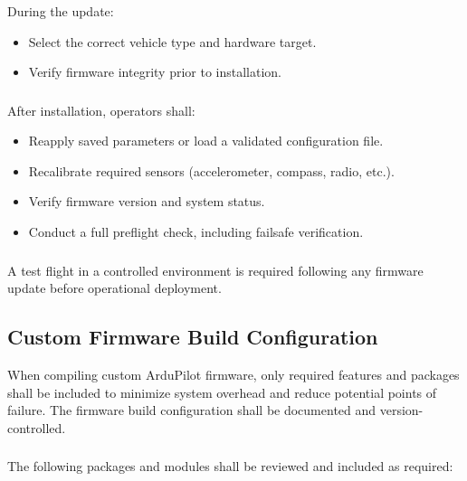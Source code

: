         \subsubsection{} During the update:
        \begin{itemize}
            \item Select the correct vehicle type and hardware target.
            \item Verify firmware integrity prior to installation.
        \end{itemize}
        
        \subsubsection{} After installation, operators shall:
        \begin{itemize}
            \item Reapply saved parameters or load a validated configuration file.
            \item Recalibrate required sensors (accelerometer, compass, radio, etc.).
            \item Verify firmware version and system status.
            \item Conduct a full preflight check, including failsafe verification.
        \end{itemize}
        
        \subsubsection{} A test flight in a controlled environment is required following any firmware update before operational deployment.
        
    \subsection{Custom Firmware Build Configuration}
        
        When compiling custom ArduPilot firmware, only required features and packages shall be included to minimize system overhead and reduce potential points of failure. The firmware build configuration shall be documented and version-controlled. 
        
        \subsubsection{} The following packages and modules shall be reviewed and included as required:
        
